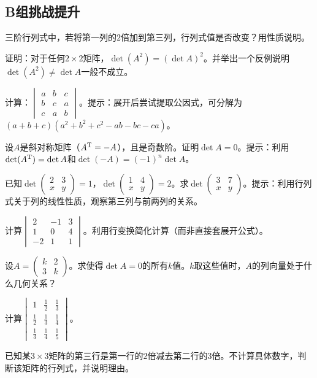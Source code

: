 \subsection*{B组\quad 挑战提升}
\begin{exercise}
\item 三阶行列式中，若将第一列的$2$倍加到第三列，行列式值是否改变？用性质说明。
\item 证明：对于任何$2\times2$矩阵，$\det(A^2)=(\det A)^2$。并举出一个反例说明$\det(A^2)\neq\det A$一般不成立。
\item 计算：$\begin{vmatrix}a&b&c\\b&c&a\\c&a&b\end{vmatrix}$。提示：展开后尝试提取公因式，可分解为$(a+b+c)(a^2+b^2+c^2-ab-bc-ca)$。
\item 设$A$是斜对称矩阵（$A^{\text T}=-A$），且是奇数阶。证明$\det A=0$。提示：利用$\det(A^{\text T})=\det A$和$\det(-A)=(-1)^n\det A$。
\item 已知$\det\begin{pmatrix}2&3\\x&y\end{pmatrix}=1$，$\det\begin{pmatrix}1&4\\x&y\end{pmatrix}=2$。求$\det\begin{pmatrix}3&7\\x&y\end{pmatrix}$。提示：利用行列式关于列的线性性质，观察第三列与前两列的关系。
\item 计算$\begin{vmatrix}2&-1&3\\1&0&4\\-2&1&1\end{vmatrix}$。利用行变换简化计算（而非直接套展开公式）。
\item 设$A=\begin{pmatrix}k&2\\3&k\end{pmatrix}$。求使得$\det A=0$的所有$k$值。$k$取这些值时，$A$的列向量处于什么几何关系？
\item 计算$\begin{vmatrix}1&\frac12&\frac13\\\frac12&\frac13&\frac14\\\frac13&\frac14&\frac15\end{vmatrix}$。
\item 已知某$3\times3$矩阵的第三行是第一行的$2$倍减去第二行的$3$倍。不计算具体数字，判断该矩阵的行列式，并说明理由。
\end{exercise}

\newpage
